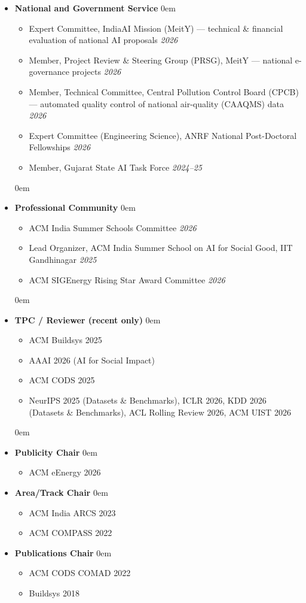 \documentclass[letter,10pt]{article}
\begin{document}
\begin{itemize}
\itemsep0em
\item[] \textbf{National and Government Service}
\itemsep0em
    \begin{itemize}
    \item Expert Committee, IndiaAI Mission (MeitY) --- technical \& financial evaluation of national AI proposals \hfill\textit{2026}
    \item Member, Project Review \& Steering Group (PRSG), MeitY --- national e-governance projects \hfill\textit{2026}
    \item Member, Technical Committee, Central Pollution Control Board (CPCB) --- automated quality control of national air-quality (CAAQMS) data \hfill\textit{2026}
    \item Expert Committee (Engineering Science), ANRF National Post-Doctoral Fellowships \hfill\textit{2026}
    \item Member, Gujarat State AI Task Force \hfill\textit{2024--25}
    \end{itemize}
\itemsep0em
\item[] \textbf{Professional Community}
\itemsep0em
    \begin{itemize}
    \item ACM India Summer Schools Committee \hfill\textit{2026}
    \item Lead Organizer, ACM India Summer School on AI for Social Good, IIT Gandhinagar \hfill\textit{2025}
    \item ACM SIGEnergy Rising Star Award Committee \hfill\textit{2026}
    \end{itemize}
\itemsep0em
\item[] \textbf{TPC / Reviewer (recent only)}
\itemsep0em
    \begin{itemize}
    \item ACM Buildsys 2025
    \item AAAI 2026 (AI for Social Impact)
    \item ACM CODS 2025
    \item NeurIPS 2025 (Datasets \& Benchmarks), ICLR 2026, KDD 2026 (Datasets \& Benchmarks), ACL Rolling Review 2026, ACM UIST 2026
    \end{itemize}
\itemsep0em 
\item[] \textbf{Publicity Chair}
\itemsep0em 
    \begin{itemize}
    \item ACM eEnergy 2026
    \end{itemize}

 \item[] \textbf{Area/Track Chair}
\itemsep0em 
    \begin{itemize}
    \item ACM India ARCS 2023
    \item ACM COMPASS 2022
    \end{itemize}
 \item[] \textbf{Publications Chair}
\itemsep0em 
    \begin{itemize}
    \item ACM CODS COMAD 2022
        \item Buildsys 2018
    \end{itemize}


\end{itemize}
\end{document}
